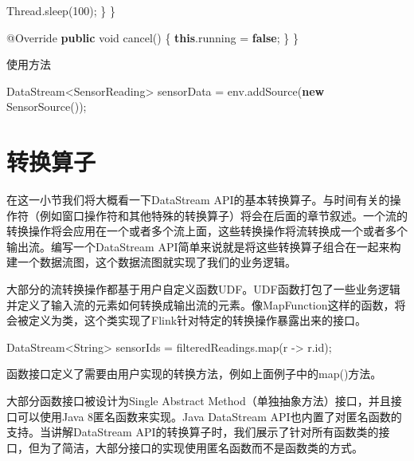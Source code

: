 \documentclass[cn,11pt,chinese]{elegantbook}
\newenvironment{Shaded}{}{}
\newcommand{\AttributeTok}[1]{\textcolor[rgb]{0.49,0.56,0.16}{#1}}
\newcommand{\BuiltInTok}[1]{#1}
\newcommand{\DataTypeTok}[1]{\textcolor[rgb]{0.56,0.13,0.00}{#1}}
\newcommand{\DecValTok}[1]{\textcolor[rgb]{0.25,0.63,0.44}{#1}}
\newcommand{\FunctionTok}[1]{\textcolor[rgb]{0.02,0.16,0.49}{#1}}
\newcommand{\KeywordTok}[1]{\textcolor[rgb]{0.00,0.44,0.13}{\textbf{#1}}}
\newcommand{\NormalTok}[1]{#1}
\begin{document}
\begin{Shaded}
\begin{Highlighting}[]
            \BuiltInTok{Thread}\NormalTok{.}\FunctionTok{sleep}\NormalTok{(}\DecValTok{100}\NormalTok{);}
\NormalTok{        \}}
\NormalTok{    \}}

    \AttributeTok{@Override}
    \KeywordTok{public} \DataTypeTok{void} \FunctionTok{cancel}\NormalTok{() \{}
        \KeywordTok{this}\NormalTok{.}\FunctionTok{running}\NormalTok{ = }\KeywordTok{false}\NormalTok{;}
\NormalTok{    \}}
\NormalTok{\}}
\end{Highlighting}
\end{Shaded}

使用方法

\begin{Shaded}
\begin{Highlighting}[]
\NormalTok{DataStream\textless{}SensorReading\textgreater{} sensorData = env.}\FunctionTok{addSource}\NormalTok{(}\KeywordTok{new} \FunctionTok{SensorSource}\NormalTok{());}
\end{Highlighting}
\end{Shaded}

\hypertarget{ux8f6cux6362ux7b97ux5b50-1}{%
\section{转换算子}\label{ux8f6cux6362ux7b97ux5b50-1}}

在这一小节我们将大概看一下DataStream
API的基本转换算子。与时间有关的操作符（例如窗口操作符和其他特殊的转换算子）将会在后面的章节叙述。一个流的转换操作将会应用在一个或者多个流上面，这些转换操作将流转换成一个或者多个输出流。编写一个DataStream
API简单来说就是将这些转换算子组合在一起来构建一个数据流图，这个数据流图就实现了我们的业务逻辑。

大部分的流转换操作都基于用户自定义函数UDF。UDF函数打包了一些业务逻辑并定义了输入流的元素如何转换成输出流的元素。像MapFunction这样的函数，将会被定义为类，这个类实现了Flink针对特定的转换操作暴露出来的接口。

\begin{Shaded}
\begin{Highlighting}[]
\NormalTok{DataStream\textless{}}\BuiltInTok{String}\NormalTok{\textgreater{} sensorIds = filteredReadings.}\FunctionTok{map}\NormalTok{(r {-}\textgreater{} r.}\FunctionTok{id}\NormalTok{);}
\end{Highlighting}
\end{Shaded}

函数接口定义了需要由用户实现的转换方法，例如上面例子中的map()方法。

大部分函数接口被设计为Single Abstract
Method（单独抽象方法）接口，并且接口可以使用Java 8匿名函数来实现。Java
DataStream API也内置了对匿名函数的支持。当讲解DataStream
API的转换算子时，我们展示了针对所有函数类的接口，但为了简洁，大部分接口的实现使用匿名函数而不是函数类的方式。
\end{document}
